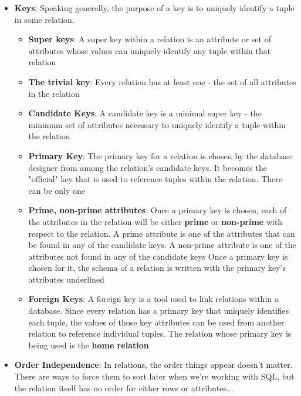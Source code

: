 \documentclass{report}
\begin{document}
\begin{itemize}
\begin{itemize}
            \end{itemize}
        \item \textbf{Keys}: Speaking generally, the purpose of a key is to uniquely identify a tuple in some relation.
            \begin{itemize}
                \item \textbf{Super keys}: A super key within a relation is an attribute or set of attributes whose values can uniquely identify any tuple within that relation
                \item \textbf{The trivial key}: Every relation has at least one - the set of all attributes in the relation 
                \item \textbf{Candidate Keys}: A candidate key is a minimal super key - the minimum set of attributes necessary to uniquely identify a tuple within the relation
                \item \textbf{Primary Key}: The primary key for a relation is chosen by the database designer from among the relation's candidate keys. It becomes the "official" key that is used to reference tuples within the relation. There can be only one
                \item \textbf{Prime, non-prime attributes}: Once a primary key is chosen, each of the attributes in the relation will be either \textbf{prime} or \textbf{non-prime} with respect to the relation. A prime attribute is one of the attributes that can be found in any of the candidate keys. A non-prime attribute is one of the attributes not found in any of the candidate keys
                    \bigbreak \noindent 
                    Once a primary key is chosen for it, the schema of a relation is written with the primary key's attributes underlined
                \item \textbf{Foreign Keys}: A foreign key is a tool used to link relations within a database. Since every relation has a primary key that uniquely identifies each tuple, the values of those key attributes can be used from another relation to reference individual tuples.
                    \bigbreak \noindent 
                    The relation whose primary key is being used is the \textbf{home relation}
            \end{itemize}
        \item \textbf{Order Independence}: In relations, the order things appear doesn't matter. There are ways to force them to sort later when we're working with SQL, but the relation itself has no order for either rows or attributes...

\end{itemize}
\end{document}
